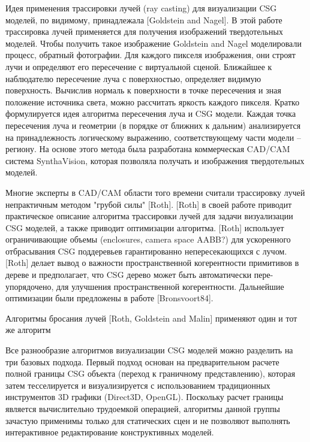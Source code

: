 Идея применения трассировки лучей (ray casting) для визуализации CSG моделей, по видимому, принадлежала [Goldstein and Nagel]. В этой работе трассировка лучей применяется для получения  изображений твердотельных моделей. Чтобы получить такое изображение Goldstein and Nagel моделировали процесс, обратный фотографии. Для каждого пикселя изображения, они строят лучи и определяют его пересечение с виртуальной сценой. Ближайшее к наблюдателю пересечение луча с поверхностью, определяет видимую поверхность. Вычислив нормаль к поверхности в точке пересечения и зная положение источника света, можно рассчитать яркость каждого пикселя. Кратко формулируется идея алгоритма пересечения луча и CSG модели. Каждая точка пересечения луча и геометрии (в порядке от ближних к дальним) анализируется на принадлежность логическому выражению, соответствующему части модели -- региону. На основе этого метода была разработана коммерческая CAD/CAM система SynthaVision, которая позволяла получать  и  изображения твердотельных моделей.

Многие эксперты в CAD/CAM области того времени считали трассировку лучей непрактичным методом "грубой силы" [Roth]. [Roth] в своей работе приводит практическое описание алгоритма трассировки лучей для задачи визуализации CSG моделей, а также приводит оптимизации алгоритма. [Roth] использует ограничивающие объемы (enclosures, camera space AABB?) для ускоренного отбрасывания CSG поддеревьев гарантированно непересекающихся с лучом. [Roth] делает вывод о важности пространственной когерентности примитивов в дереве и предполагает, что CSG дерево может быть автоматически пере-упорядочено, для улучшения пространственной когерентности. Дальнейшие оптимизации были предложены в работе [Bronsvoort84].

Алгоритмы бросания лучей [Roth, Goldstein and Malin] применяют один и тот же алгоритм 


Все разнообразие алгоритмов визуализации CSG моделей можно разделить на три базовых подхода. Первый подход основан на предварительном расчете полной границы CSG объекта (переход к граничному представлению), которая затем тесселируется и визуализируется с использованием традиционных инструментов 3D графики (Direct3D, OpenGL). Поскольку расчет границы является  вычислительно трудоемкой операцией, алгоритмы данной группы зачастую применимы только для статических сцен и не позволяют выполнять интерактивное редактирование конструктивных моделей.

